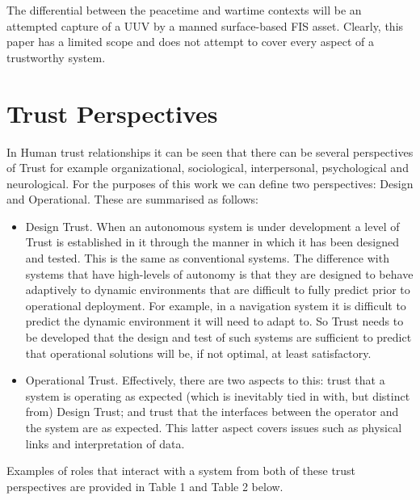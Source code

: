
The differential between the peacetime and wartime contexts will be an attempted capture of a UUV by a manned surface-based FIS asset.
Clearly, this paper has a limited scope and does not attempt to cover every aspect of a trustworthy system.

\section{Trust Perspectives}

In Human trust relationships it can be seen that there can be several perspectives of Trust for example organizational, sociological, interpersonal, psychological and neurological\cite{Lee2004}. For the purposes of this work we can define two perspectives: Design and Operational. These are summarised as follows:
\begin{itemize}
	\item Design Trust. When an autonomous system is under development a level of Trust is established in it through the manner in which it has been designed and tested. This is the same as conventional systems. The difference with systems that have high-levels of autonomy is that they are designed to behave adaptively to dynamic environments that are difficult to fully predict prior to operational deployment. For example, in a navigation system it is difficult to predict the dynamic environment it will need to adapt to. So Trust needs to be developed that the design and test of such systems are sufficient to predict that operational solutions will be, if not optimal, at least satisfactory.
	\item Operational Trust. Effectively, there are two aspects to this: trust that a system is operating as expected (which is inevitably tied in with, but distinct from) Design Trust; and trust that the interfaces between the operator and the system are as expected. This latter aspect covers issues such as physical links and interpretation of data.
\end{itemize}

Examples of roles that interact with a system from both of these trust perspectives are provided in Table 1 and Table 2 below.

